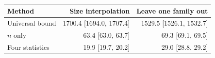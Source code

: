 \begin{tabular}{lrr}
\toprule
Method & Size interpolation & Leave one family out\\
\midrule
Universal bound & 1700.4 [1694.0, 1707.4] & 1529.5 [1526.1, 1532.7] \\
$n$ only & 63.4 [63.0, 63.7] & 69.3 [69.1, 69.5] \\
Four statistics & 19.9 [19.7, 20.2] & 29.0 [28.8, 29.2] \\
\bottomrule
\end{tabular}
